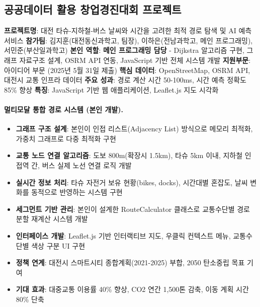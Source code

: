 \subsection{공공데이터 활용 창업경진대회 프로젝트}
\label{subsec:gonggong_summary}
\textbf{프로젝트명}: 대전 타슈-지하철-버스 날씨와 시간을 고려한 최적 경로 탐색 및 AI 예측 서비스\newline
\textbf{참가팀}: 김지훈(대전동신과학고, 팀장), 이하은(전남과학고, 메인 프로그래밍), 서민준(부산일과학고)\newline
\textbf{본인 역할}: \textbf{메인 프로그래밍 담당} - Dijkstra 알고리즘 구현, 그래프 자료구조 설계, OSRM API 연동, JavaScript 기반 전체 시스템 개발\newline
\textbf{지원부문}: 아이디어 부문 (2025년 5월 31일 제출)\newline
\textbf{핵심 데이터}: OpenStreetMap, OSRM API, 대전시 교통 인프라 데이터\newline
\textbf{주요 성과}: 경로 계산 시간 50-100ms, 시간 예측 정확도 85\% 향상\newline
\textbf{특징}: JavaScript 기반 웹 애플리케이션, Leaflet.js 지도 시각화

\paragraph{멀티모달 통합 경로 시스템 (본인 개발).}
\begin{itemize}[leftmargin=*]
    \item \textbf{그래프 구조 설계}: 본인이 인접 리스트(Adjacency List) 방식으로 메모리 최적화, 가중치 그래프로 다중 최적화 구현
    \item \textbf{교통 노드 연결 알고리즘}: 도보 800m(확장시 1.5km), 타슈 5km 이내, 지하철 인접역 간, 버스 실제 노선 연결 로직 개발
    \item \textbf{실시간 정보 처리}: 타슈 자전거 보유 현황(bikes, docks), 시간대별 혼잡도, 날씨 변화를 동적으로 반영하는 시스템 구현
    \item \textbf{세그먼트 기반 관리}: 본인이 설계한 RouteCalculator 클래스로 교통수단별 경로 분할 재계산 시스템 개발
    \item \textbf{인터페이스 개발}: Leaflet.js 기반 인터랙티브 지도, 우클릭 컨텍스트 메뉴, 교통수단별 색상 구분 UI 구현
    \item \textbf{정책 연계}: 대전시 스마트시티 종합계획(2021-2025) 부합, 2050 탄소중립 목표 기여
    \item \textbf{기대 효과}: 대중교통 이용률 40\% 향상, CO2 연간 1,500톤 감축, 이동 계획 시간 80\% 단축
\end{itemize}